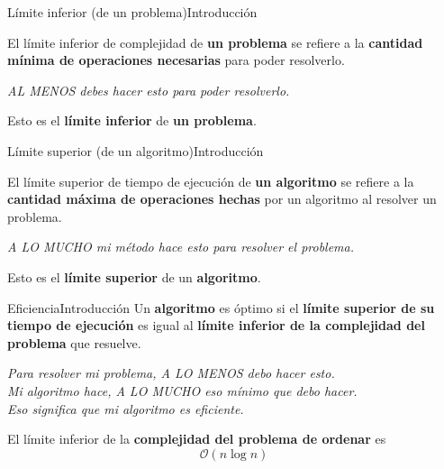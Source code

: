 \documentclass[spanish, c]{beamer}
\newcommand{\bigO}{\mathcal{O}}
\begin{document}
\begin{frame}{Límite inferior (de un problema)}{Introducción}

    El \alert{límite inferior de complejidad} de \textbf{un problema} se refiere a la \textbf{cantidad mínima de operaciones necesarias} para poder resolverlo. \pause

    \bigskip

    \begin{center}
        \Large \textit{AL MENOS debes hacer esto para poder resolverlo.}
    \end{center} \pause

    \bigskip

    Esto es el \textbf{límite inferior} de \textbf{un problema}.
\end{frame}

\begin{frame}{Límite superior (de un algoritmo)}{Introducción}

    El \alert{límite superior de tiempo de ejecución} de \textbf{un algoritmo} se refiere a la \textbf{cantidad máxima de operaciones hechas} por un algoritmo al resolver un problema. \pause

    \bigskip

    \begin{center}
        \Large \textit{A LO MUCHO mi método hace esto para resolver el problema.}
    \end{center} \pause

    \bigskip

    Esto es el \textbf{límite superior} de un \textbf{algoritmo}.
\end{frame}

\begin{frame}{Eficiencia}{Introducción}
    Un \textbf{algoritmo} es \alert{óptimo} si el \textbf{límite superior de su tiempo de ejecución} es \alert{igual} al \textbf{límite inferior de la complejidad del problema} que resuelve. \pause

    \bigskip

    \begin{center}
        \Large
        \textit{Para resolver mi problema, A LO MENOS debo hacer esto.}\\ \pause
        \textit{Mi algoritmo hace, A LO MUCHO eso mínimo que debo hacer.}\\ \pause
        \textit{Eso significa que mi algoritmo es eficiente.} \pause
    \end{center}

    \bigskip

    El límite inferior de la \textbf{complejidad del problema de ordenar} es $$\bigO(n \log n)$$
\end{frame}
\end{document}
